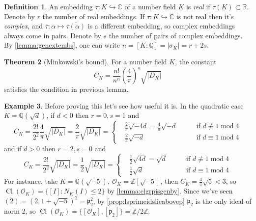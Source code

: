 \documentclass{article}
\newcommand{\Z}{\mathbb{Z}}
\newcommand{\Q}{\mathbb{Q}}
\newcommand{\R}{\mathbb{R}}
\newcommand{\C}{\mathbb{C}}
\newcommand{\Mod}{\operatorname{mod}}
\newcommand{\Cl}{\operatorname{Cl}}
\newcommand{\ri}{\mathcal{O}}
\newcommand{\ip}{\mathfrak{p}}
\theoremstyle{definition}
\newtheorem{defn}{Definition}[subsection]
\newtheorem{thm}[defn]{Theorem}
\newtheorem{example}[defn]{Example}
\begin{document}
\begin{defn}
An embedding $\tau:K\hookrightarrow\C$ of a number field $K$ is \textit{real} if $\tau(K)\subset\R$. Denote by $r$ the number of real embeddings. If $\tau:K\hookrightarrow\C$ is not real then it's \textit{complex}, and $\overline\tau:\alpha\mapsto\overline{\tau(\alpha)}$ is a different embedding, so complex embeddings always come in pairs. Denote by $s$ the number of pairs of complex embeddings. By \ref{lemma:genextembs}, one can write $n=[K:\Q]=\left|\sigma_K\right|=r+2s$.
\end{defn}

\begin{thm}[Minkowski's bound]
\label{thm:Minkowskibound}
For a number field $K$, the constant
\[
C_K=\frac{n!}{n^n}\left(\frac{4}{\pi}\right)^s\sqrt{|D_K|}
\]
satisfies the condition in previous lemma.
\end{thm}

\begin{example}
\label{example:Minkowskibound}
Before proving this let's see how useful it is. In the quadratic case $K=\Q\left(\sqrt d\right)$, if $d<0$ then $r=0,s=1$ and
\[
C_K=\frac{2!}{2^2}\frac{4}{\pi}\sqrt{|D_K|}=\frac{2}{\pi}\sqrt{|D_K|}=\left\{
\begin{aligned}
&\frac{2}{\pi}\sqrt{-4d}=\frac{4}{\pi}\sqrt{-d}\qquad &\text{if }d\not\equiv 1\Mod 4 \\
&\frac{2}{\pi}\sqrt{-d}\qquad &\text{if }d\equiv 1\Mod 4
\end{aligned}
\right.
\]
and if $d>0$ then $r=2,s=0$ and
\[
C_K=\frac{2!}{2^2}\sqrt{|D_K|}=\frac{1}{2}\sqrt{|D_K|}=\left\{
\begin{aligned}
&\frac{1}{2}\sqrt{4d}=\sqrt{d}\qquad &\text{if }d\not\equiv 1\Mod 4 \\
&\frac{1}{2}\sqrt{d}\qquad &\text{if }d\equiv 1\Mod 4
\end{aligned}
\right.
\]
For instance, take $K=\Q\left(\sqrt{-5}\right),\ \ri_K=\Z\left[\sqrt{-5}\right]$, then $C_K=\frac{4}{\pi}\sqrt{5}<3$, so $\Cl(\ri_K)=\{[I]:N_K(I)\leq 2\}$ by \ref{lemma:clgrpisgenby}. Since we've seen $(2)=\left(2,1+\sqrt{-5}\right)^2=\ip_2^2$, by \ref{prop:lsprimeidslieabovep} $\ip_2$ is the only ideal of norm 2, so $\Cl(\ri_K)=\{[\ri_K],[\ip_2]\}=\Z/2\Z$.
\end{example}
\end{document}
